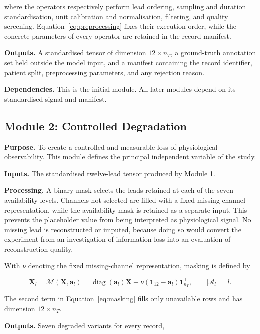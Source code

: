 \documentclass{ssnreview}
\begin{document}
where the operators respectively perform lead ordering, sampling and duration
standardisation, unit calibration and normalisation, filtering, and quality screening.
Equation~\ref{eq:preprocessing} fixes their execution order, while the concrete parameters
of every operator are retained in the record manifest.

\textbf{Outputs.} A standardised tensor of dimension $12\times n_T$, a ground-truth
annotation set held outside the model input, and a manifest containing the record
identifier, patient split, preprocessing parameters, and any rejection reason.

\textbf{Dependencies.} This is the initial module. All later modules depend on its
standardised signal and manifest.

\subsection{Module 2: Controlled Degradation}

\textbf{Purpose.} To create a controlled and measurable loss of physiological
observability. This module defines the principal independent variable of the study.

\textbf{Inputs.} The standardised twelve-lead tensor produced by Module 1.

\textbf{Processing.} A binary mask selects the leads retained at each of the seven
availability levels. Channels not selected are filled with a fixed missing-channel
representation, while the availability mask is retained as a separate input. This prevents
the placeholder value from being interpreted as physiological signal. No missing lead is
reconstructed or imputed, because doing so would convert the experiment from an
investigation of information loss into an evaluation of reconstruction quality.

With $\nu$ denoting the fixed missing-channel representation, masking is defined by

\begin{equation}
  \mathbf{X}_l
  =\mathcal{M}(\mathbf{X},\mathbf{a}_l)
  =\operatorname{diag}(\mathbf{a}_l)\mathbf{X}
  +\nu(\mathbf{1}_{12}-\mathbf{a}_l)\mathbf{1}_{n_T}^{\top},
  \qquad |\mathcal{A}_l|=l.
  \label{eq:masking}
\end{equation}

The second term in Equation~\ref{eq:masking} fills only unavailable rows and has
dimension $12\times n_T$.

\textbf{Outputs.} Seven degraded variants for every record,
\end{document}
